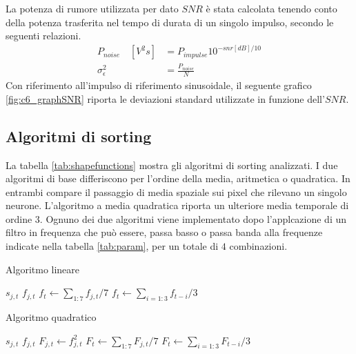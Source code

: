 \documentclass[9pt,twocolumn,twoside]{osajnl}
\begin{document}
La potenza di rumore utilizzata per dato $SNR$ è stata calcolata tenendo conto della potenza trasferita nel tempo di durata di un singolo impulso, secondo le seguenti relazioni.
\begin{align*}
P_{noise} \quad [V^2s] &=  P_{impulse} 10^{- snr [dB]/10} \\
\sigma^{2}_{\epsilon} &= \frac{ P_{noise} }{ N }
\end{align*}
Con riferimento all'impulso di riferimento sinusoidale, il seguente grafico \ref{fig:c6_graphSNR} riporta le deviazioni standard utilizzate in funzione dell'$SNR$.
%



\subsection{Algoritmi di sorting}

La tabella \ref{tab:shapefunctions} mostra gli algoritmi di sorting analizzati.
I due algoritmi di base differiscono per l'ordine della media, aritmetica o quadratica. In entrambi compare il passaggio di media spaziale sui pixel che rilevano un singolo neurone. L'algoritmo a media quadratica riporta un ulteriore media temporale di ordine $3$. Ognuno dei due algoritmi viene implementato dopo l'applcazione di un filtro in frequenza che può essere, passa basso o passa banda alla frequenze indicate nella tabella \ref{tab:param}, per un totale di $4$ combinazioni.


\begin{algorithm}
\caption{Algoritmo lineare}\label{alg:arit}
\begin{algorithmic}[1]
\State $s_{j,t}$ 
\State $f_{j,t}$ 
\State $f_{t}\gets \sum_{1:7}   f_{j,t}/7$
\State $f_{t}\gets \sum_{i=1:3} f_{t-i}/3$
\end{algorithmic}
\end{algorithm}


\begin{algorithm}
\caption{Algoritmo quadratico}\label{alg:quad}
\begin{algorithmic}[1]
\State $s_{j,t}$ 
\State $f_{j,t}$ 
\State $F_{j,t}\gets f^{2}_{j,t}$
\State $F_{t}\gets \sum_{1:7}   F_{j,t}/7$
\State $F_{t}\gets \sum_{i=1:3} F_{t-i}/3$
\end{algorithmic}
\end{algorithm}
\end{document}
